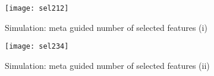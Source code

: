 \begin{figure}[H]
    \texttt{[image: sel212]}
    \caption{Simulation: meta guided number of selected features (i)}
    \label{fig:sel212}
\end{figure} 

\begin{figure}[H]
    \texttt{[image: sel234]}
    \caption{Simulation: meta guided number of selected features (ii)}
    \label{fig:sel234}
\end{figure} 

